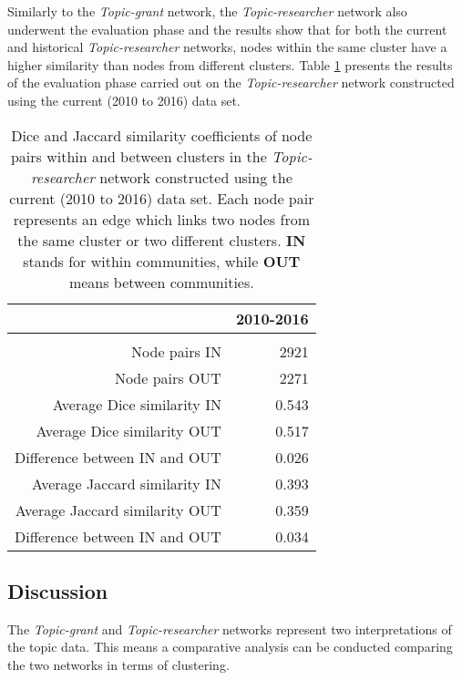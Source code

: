Similarly to the \textit{Topic-grant} network, the \textit{Topic-researcher} network also underwent the evaluation phase and the results show that for both the current and historical \textit{Topic-researcher} networks, nodes within the same cluster have a higher similarity than nodes from different clusters. Table \ref{table:topic_b_evaluation} presents the results of the evaluation phase carried out on the \textit{Topic-researcher} network constructed using the current (2010 to 2016) data set.

\begin{table}[htpb]
\centering
\caption[Dice and Jaccard similarity coefficients of node pairs within and between clusters in the \textit{Topic-researcher} constructed using the current (2010 to 2016) data set.]{Dice and Jaccard similarity coefficients of node pairs within and between clusters in the \textit{Topic-researcher} network constructed using the current (2010 to 2016) data set. Each node pair represents an edge which links two nodes from the same cluster or two different clusters. \textbf{IN} stands for within communities, while \textbf{OUT} means between communities.}
\label{table:topic_b_evaluation}
\begin{tabular}{r|r}
{} & \textbf{2010-2016}\\
\hline\\
Node pairs IN                  & {2921}\\
Node pairs OUT                 & {2271}\\
Average Dice similarity IN     & {0.543}\\
Average Dice similarity OUT    & {0.517}\\
Difference between IN and OUT  & {0.026}\\
Average Jaccard similarity IN  & {0.393}\\
Average Jaccard similarity OUT & {0.359}\\
Difference between IN and OUT  & {0.034}\\
\end{tabular}
\end{table}

\subsection{Discussion}

The \textit{Topic-grant} and \textit{Topic-researcher} networks represent two interpretations of the topic data. This means a comparative analysis can be conducted comparing the two networks in terms of clustering.

